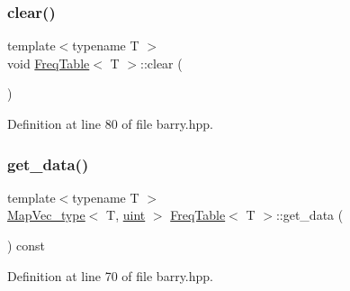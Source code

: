 \mbox{\label{classbarry_1_1_freq_table_a326660096e4309780aea8355d0f74ac7}} 
\subsubsection{\texorpdfstring{clear()}{clear()}}
{\footnotesize\ttfamily template$<$typename T $>$ \\
void \hyperlink{classbarry_1_1_freq_table}{Freq\+Table}$<$ T $>$\+::clear (\begin{DoxyParamCaption}{ }\end{DoxyParamCaption})\hspace{0.3cm}{\ttfamily [inline]}}



Definition at line 80 of file barry.\+hpp.

\mbox{\label{classbarry_1_1_freq_table_a7b99496d1c2f4193654752856b30d1a5}} 
\subsubsection{\texorpdfstring{get\+\_\+data()}{get\_data()}}
{\footnotesize\ttfamily template$<$typename T $>$ \\
\hyperlink{namespacebarry_a2f0d3aab1d67e4c8eaeab9022e16139f}{Map\+Vec\+\_\+type}$<$ T, \hyperlink{namespacebarry_a11dfc53ddb4672278319aa04f1e09a6c}{uint} $>$ \hyperlink{classbarry_1_1_freq_table}{Freq\+Table}$<$ T $>$\+::get\+\_\+data (\begin{DoxyParamCaption}{ }\end{DoxyParamCaption}) const\hspace{0.3cm}{\ttfamily [inline]}}



Definition at line 70 of file barry.\+hpp.

\mbox{\label{classbarry_1_1_freq_table_ab5dd6677f52072c93d18b2b9a3369ae7}} 
